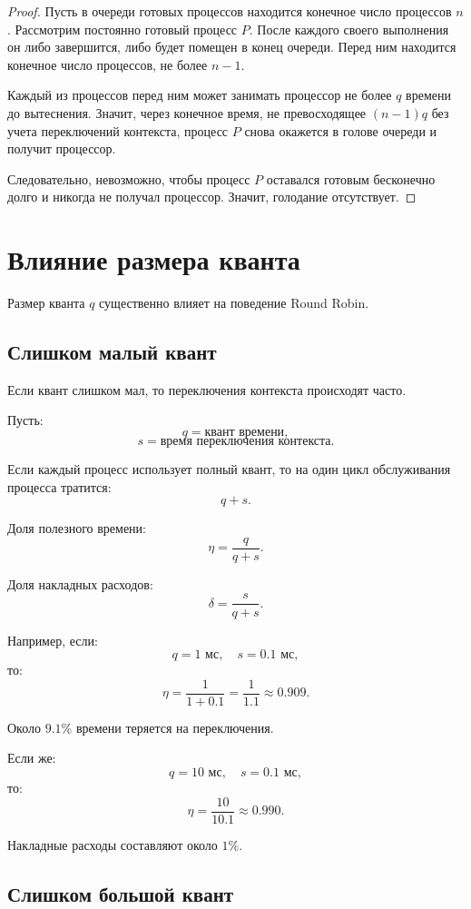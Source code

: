 \documentclass[12pt,a4paper]{article}
\begin{document}
\begin{proof}
Пусть в очереди готовых процессов находится конечное число процессов $n$. Рассмотрим постоянно готовый процесс $P$. После каждого своего выполнения он либо завершится, либо будет помещен в конец очереди. Перед ним находится конечное число процессов, не более $n-1$.

Каждый из процессов перед ним может занимать процессор не более $q$ времени до вытеснения. Значит, через конечное время, не превосходящее $(n-1)q$ без учета переключений контекста, процесс $P$ снова окажется в голове очереди и получит процессор.

Следовательно, невозможно, чтобы процесс $P$ оставался готовым бесконечно долго и никогда не получал процессор. Значит, голодание отсутствует.
\end{proof}

\section{Влияние размера кванта}

Размер кванта $q$ существенно влияет на поведение Round Robin.

\subsection{Слишком малый квант}

Если квант слишком мал, то переключения контекста происходят часто.

Пусть:
\[
q = \text{квант времени},
\]
\[
s = \text{время переключения контекста}.
\]

Если каждый процесс использует полный квант, то на один цикл обслуживания процесса тратится:
\[
q+s.
\]

Доля полезного времени:
\[
\eta = \frac{q}{q+s}.
\]

Доля накладных расходов:
\[
\delta = \frac{s}{q+s}.
\]

Например, если:
\[
q = 1 \text{ мс}, \quad s = 0.1 \text{ мс},
\]
то:
\[
\eta = \frac{1}{1+0.1} = \frac{1}{1.1} \approx 0.909.
\]

Около $9.1\%$ времени теряется на переключения.

Если же:
\[
q = 10 \text{ мс}, \quad s = 0.1 \text{ мс},
\]
то:
\[
\eta = \frac{10}{10.1} \approx 0.990.
\]

Накладные расходы составляют около $1\%$.

\subsection{Слишком большой квант}
\end{document}
